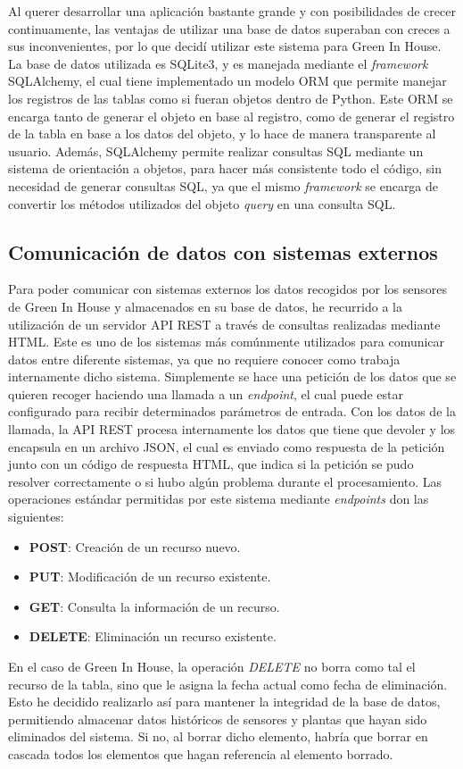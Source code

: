     Al querer desarrollar una aplicación bastante grande y con posibilidades de crecer continuamente, las ventajas de utilizar una base de datos superaban con creces a sus inconvenientes, por lo que decidí utilizar este sistema para Green In House. La base de datos utilizada es SQLite3, y es manejada mediante el \textit{framework} SQLAlchemy, el cual tiene implementado un modelo ORM que permite manejar los registros de las tablas como si fueran objetos dentro de Python. Este ORM se encarga tanto de generar el objeto en base al registro, como de generar el registro de la tabla en base a los datos del objeto, y lo hace de manera transparente al usuario. Además, SQLAlchemy permite realizar consultas SQL mediante un sistema de orientación a objetos, para hacer más consistente todo el código, sin necesidad de generar consultas SQL, ya que el mismo \textit{framework} se encarga de convertir los métodos utilizados del objeto \textit{query} en una consulta SQL.  

    \subsection{Comunicación de datos con sistemas externos}
    Para poder comunicar con sistemas externos los datos recogidos por los sensores de Green In House y almacenados en su base de datos, he recurrido a la utilización de un servidor API REST a través de consultas realizadas mediante HTML. 
    Este es uno de los sistemas más comúnmente utilizados para comunicar datos entre diferente sistemas, ya que no requiere conocer como trabaja internamente dicho sistema. Simplemente se hace una petición de los datos que se quieren recoger haciendo una llamada a un \textit{endpoint}, el cual puede estar configurado para recibir determinados parámetros de entrada. Con los datos de la llamada, la API REST procesa internamente los datos que tiene que devoler y los encapsula en un archivo JSON, el cual es enviado como respuesta de la petición junto con un código de respuesta HTML, que indica si la petición se pudo resolver correctamente o si hubo algún problema durante el procesamiento. 
    Las operaciones estándar permitidas por este sistema mediante \textit{endpoints} don las siguientes:
    \begin{itemize}
        \item \textbf{POST}: Creación de un recurso nuevo.
        \item \textbf{PUT}: Modificación de un recurso existente.
        \item \textbf{GET}: Consulta la información de un recurso.
        \item \textbf{DELETE}: Eliminación un recurso existente.
    \end{itemize}
    En el caso de Green In House, la operación \textit{DELETE} no borra como tal el recurso de la tabla, sino que le asigna la fecha actual como fecha de eliminación. Esto he decidido realizarlo así para mantener la integridad de la base de datos, permitiendo almacenar datos históricos de sensores y plantas que hayan sido eliminados del sistema. Si no, al borrar dicho elemento, habría que borrar en cascada todos los elementos que hagan referencia al elemento borrado.

